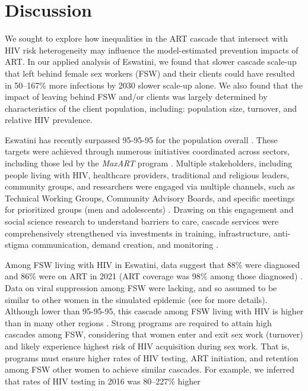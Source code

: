 \section{Discussion}\label{art.disc}
We sought to explore how inequalities in the ART cascade
that intersect with HIV risk heterogeneity
may influence the model-estimated prevention impacts of ART.
In our applied analysis of Eswatini, we found that
slower cascade scale-up that left behind female sex workers (FSW) and their clients
could have resulted in 50--167\% more infections by 2030 \vs slower scale-up alone.
We also found that the impact of
leaving behind FSW and/or clients was largely determined by
characteristics of the client population, including:
population size, turnover, and relative HIV prevalence.
\par
Eswatini has recently surpassed 95-95-95 for the population overall \cite{SHIMS3}.
These targets were achieved through
numerous initiatives coordinated across sectors,
including those led by the \emph{MaxART} program \cite{MaxART1,MaxART2}.
Multiple stakeholders, including people living with HIV, healthcare providers,
traditional and religious leaders, community groups, and researchers
were engaged via multiple channels, such as
Technical Working Groups, Community Advisory Boards,
and specific meetings for prioritized groups (men and adolescents) \cite{MaxART1,MaxART2}.
Drawing on this engagement and
social science research to understand barriers to care,
cascade services were comprehensively strengthened via investments in
training, infrastructure, anti-stigma communication, demand creation, and monitoring
\cite{MaxART1,MaxART2}.
\par
Among FSW living with HIV in Eswatini, data suggest that
88\% were diagnosed and 86\% were on ART in 2021
(\ie ART coverage was 98\% among those diagnosed) \cite{EswIBBS2022}.
Data on viral suppression among FSW were lacking,
and so assumed to be similar to other women in the simulated epidemic
(see  for more details).
Although lower than 95-95-95, this cascade among FSW living with HIV
is higher than in many other regions \cite{Schwartz2017,Hakim2018}.
Strong programs are required to attain high cascades among FSW,
considering that women enter and exit sex work (turnover) and
likely experience highest risk of HIV acquisition during sex work.
That is, programs must ensure higher rates of HIV testing, ART initiation, and retention
among FSW \vs other women to achieve similar cascades.
For example, we inferred that rates of HIV testing in 2016 was 80--227\% higher
